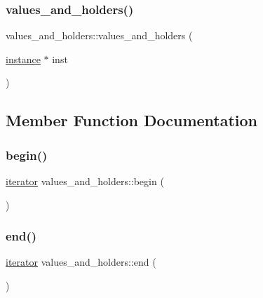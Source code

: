 \subsubsection{\texorpdfstring{values\_and\_holders()}{values\_and\_holders()}}
{\footnotesize\ttfamily values\+\_\+and\+\_\+holders\+::values\+\_\+and\+\_\+holders (\begin{DoxyParamCaption}\item[{\mbox{\hyperlink{structinstance}{instance}} $\ast$}]{inst }\end{DoxyParamCaption})\hspace{0.3cm}{\ttfamily [inline]}}



\subsection{Member Function Documentation}
\mbox{\label{structvalues__and__holders_a4b6337584db727cac492ff39efd8700d}} 
\subsubsection{\texorpdfstring{begin()}{begin()}}
{\footnotesize\ttfamily \mbox{\hyperlink{structvalues__and__holders_1_1iterator}{iterator}} values\+\_\+and\+\_\+holders\+::begin (\begin{DoxyParamCaption}{ }\end{DoxyParamCaption})\hspace{0.3cm}{\ttfamily [inline]}}

\mbox{\label{structvalues__and__holders_a79960cef9a673316bd048a0f34425707}} 
\subsubsection{\texorpdfstring{end()}{end()}}
{\footnotesize\ttfamily \mbox{\hyperlink{structvalues__and__holders_1_1iterator}{iterator}} values\+\_\+and\+\_\+holders\+::end (\begin{DoxyParamCaption}{ }\end{DoxyParamCaption})\hspace{0.3cm}{\ttfamily [inline]}}


